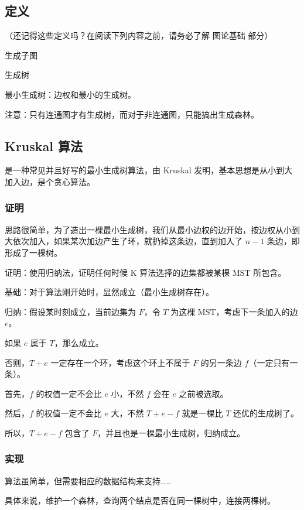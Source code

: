 
\subsection{定义}

（还记得这些定义吗？在阅读下列内容之前，请务必了解  图论基础  部分）

生成子图

生成树

最小生成树：边权和最小的生成树。

注意：只有连通图才有生成树，而对于非连通图，只能搞出生成森林。

\subsection{Kruskal 算法}

是一种常见并且好写的最小生成树算法，由 Kruskal 发明，基本思想是从小到大加入边，是个贪心算法。

\subsubsection{证明}

思路很简单，为了造出一棵最小生成树，我们从最小边权的边开始，按边权从小到大依次加入，如果某次加边产生了环，就扔掉这条边，直到加入了 $n-1$ 条边，即形成了一棵树。

证明：使用归纳法，证明任何时候 K 算法选择的边集都被某棵 MST 所包含。

基础：对于算法刚开始时，显然成立（最小生成树存在）。

归纳：假设某时刻成立，当前边集为 $F$，令 $T$ 为这棵 MST，考虑下一条加入的边 $e$。

如果 $e$ 属于 $T$，那么成立。

否则，$T+e$ 一定存在一个环，考虑这个环上不属于 $F$ 的另一条边 $f$（一定只有一条）。

首先，$f$ 的权值一定不会比 $e$ 小，不然 $f$ 会在 $e$ 之前被选取。

然后，$f$ 的权值一定不会比 $e$ 大，不然 $T+e-f$ 就是一棵比 $T$ 还优的生成树了。

所以，$T+e-f$ 包含了 $F$，并且也是一棵最小生成树，归纳成立。

\subsubsection{实现}

算法虽简单，但需要相应的数据结构来支持……

具体来说，维护一个森林，查询两个结点是否在同一棵树中，连接两棵树。

